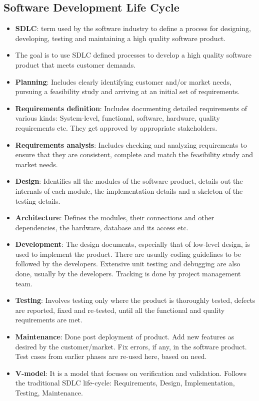 \documentclass[a4paper]{article}
\begin{document}
\subsection{Software Development Life Cycle}
\begin{itemize}
    \item \textbf{SDLC}: term used by the software industry to define a process for designing, developing, testing and maintaining a high quality software product.
    \item The goal is to use SDLC defined processes to develop a high quality software product that meets customer demands.
    \item \textbf{Planning}: Includes clearly identifying customer and/or market needs, pursuing a feasibility study and arriving at an initial set of requirements.
    \item \textbf{Requirements definition}: Includes documenting detailed requirements of various kinds: System-level, functional, software, hardware, quality requirements etc. They get approved by appropriate stakeholders.
    \item \textbf{Requirements analysis}: Includes checking and analyzing requirements to ensure that they are consistent, complete and match the feasibility study and market needs.
    \item \textbf{Design}: Identifies all the modules of the software product, details out the internals of each module, the implementation details and a skeleton of the testing details.
    \item \textbf{Architecture}: Defines the modules, their connections and other dependencies, the hardware, database and its access etc.
    \item \textbf{Development}: The design documents, especially that of low-level design, is used to implement the product. There are usually coding guidelines to be followed by the developers. Extensive unit testing and debugging are also done, usually by the developers. Tracking is done by project management team.
    \item \textbf{Testing}: Involves testing only where the product is thoroughly tested, defects are reported, fixed and re-tested, until all the functional and quality requirements are met.
    \item \textbf{Maintenance}: Done post deployment of product. Add new features as desired by the customer/market. Fix errors, if any, in the software product. Test cases from earlier phases are re-used here, based on need.
    \item \textbf{V-model}: It is a model that focuses on verification and validation. Follows the traditional SDLC life-cycle: Requirements, Design, Implementation, Testing, Maintenance.

\end{itemize}
\end{document}
